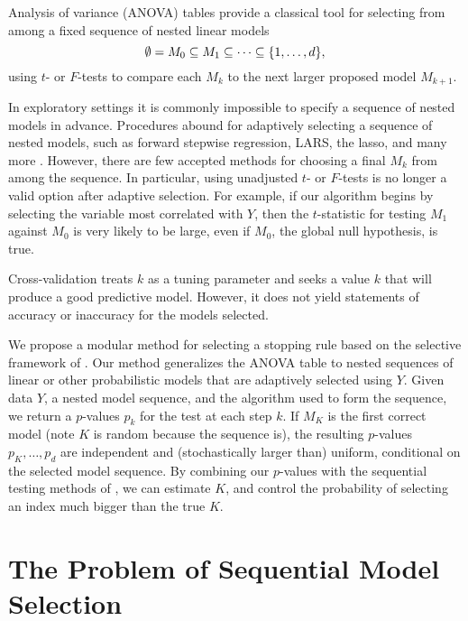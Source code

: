\documentclass{article}
\begin{document}
Analysis of variance (ANOVA) tables provide a classical tool for selecting from among a fixed sequence of nested linear models 
\begin{equation}
  \emptyset = M_0 \subseteq M_1 \subseteq \cdots \subseteq \{1,\ldots,d\},
\end{equation}
using $t$- or $F$-tests to compare each $M_k$ to the next larger proposed model $M_{k+1}$.

In exploratory settings it is commonly impossible to specify a sequence of nested models in advance. Procedures abound for adaptively selecting a sequence of nested models, such as forward stepwise regression, LARS, the lasso, and many more \citep{ESL}. However, there are few accepted methods for choosing a final $M_k$ from among the sequence. In particular, using unadjusted $t$- or $F$-tests is no longer a valid option after adaptive selection. For example, if our algorithm begins by selecting the variable most correlated with $Y$, then the $t$-statistic for testing $M_1$ against $M_0$ is very likely to be large, even if $M_0$, the global null hypothesis, is true.

Cross-validation treats $k$ as a tuning parameter and seeks a value $k$ that will produce a good predictive model. However, it does not yield statements of accuracy or inaccuracy for the models selected.

We propose a modular method for selecting a stopping rule based on the selective framework of \citet{fithian2014optimal}. Our method generalizes the ANOVA table to nested sequences of linear or other probabilistic models that are adaptively selected using $Y$. Given data $Y$, a nested model sequence, and the algorithm used to form the sequence, we return a $p$-values $p_k$ for the test at each step $k$. If $M_K$ is the first correct model (note $K$ is random because the sequence is), the resulting $p$-values $p_{K}, \ldots, p_d$ are independent and (stochastically larger than) uniform, conditional on the selected model sequence. By combining our $p$-values with the sequential testing methods of \citet{wager2014}, we can estimate $K$, and control the probability of selecting an index much bigger than the true $K$.



\section{The Problem of Sequential Model Selection}
\end{document}

